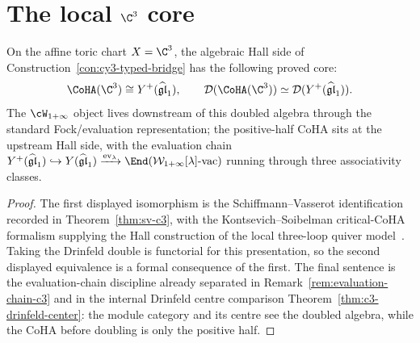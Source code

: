 \section{The local \texorpdfstring{$\C^3$}{C3} core}
\label{sec:cy3-chain-level-bridge-local-core}

\begin{proposition}[$\C^3$ core]
\label{prop:cy3-c3-bridge-core}
On the affine toric chart $X=\C^3$, the algebraic Hall side of
Construction~\ref{con:cy3-typed-bridge} has the following proved core:
\[
 \CoHA(\C^3)\cong Y^+(\widehat{\mathfrak{gl}}_1),
 \qquad
 \mathcal{D}(\CoHA(\C^3))
 \simeq
 \mathcal{D}(Y^+(\widehat{\mathfrak{gl}}_1)).
\]
The $\cW_{1+\infty}$ object lives downstream of this doubled algebra
through the standard Fock/evaluation representation; the positive-half
CoHA sits at the upstream Hall side, with the evaluation chain
$Y^+(\widehat{\mathfrak{gl}}_1) \hookrightarrow Y(\widehat{\mathfrak{gl}}_1) \xrightarrow{\mathrm{ev}_\lambda} \End(\mathcal{W}_{1+\infty}[\lambda]\text{-vac})$
running through three associativity classes.
\end{proposition}

\begin{proof}
The first displayed isomorphism is the Schiffmann--Vasserot
identification recorded in Theorem~\ref{thm:sv-c3}, with the
Kontsevich--Soibelman critical-CoHA formalism supplying the Hall
construction of the local three-loop quiver model~\cite{KS2008,SV13}.
Taking the Drinfeld double is functorial for this presentation, so the
second displayed equivalence is a formal consequence of the first.
The final sentence is the evaluation-chain discipline already separated
in Remark~\ref{rem:evaluation-chain-c3} and in the internal Drinfeld
centre comparison Theorem~\ref{thm:c3-drinfeld-center}: the module
category and its centre see the doubled algebra, while the CoHA before
doubling is only the positive half.
\end{proof}

